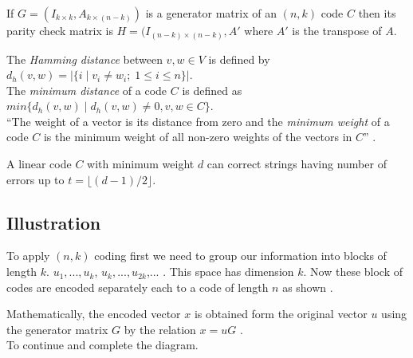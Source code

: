 \begin{theorem} \cite{coding}
  If \(G=(I_{k \times k},A_{k \times (n-k)})\) is a generator matrix of an \((n,k)\) code \(C\) then its parity check matrix is \(H=(I_{(n-k) \times (n-k)}, A'\) where \(A'\) is the transpose of \(A\).
\end{theorem}

\begin{definition} \cite{coding}
  The \textit{Hamming distance} between \(v,w \in V\) is defined by \(d_h(v,w)=|\{i\;|\; v_i \neq w_i;\; 1 \leq i \leq n \}|\).\\
  The \textit{minimum distance} of a code \(C\) is defined as \(min\{d_h(v,w)\;|\; d_h(v,w) \neq 0, v,w \in C\}\).\\
  ``The weight of a vector is its distance from zero and the \textit{minimum weight} of a code \(C\) is the minimum weight of all non-zero weights of the vectors in \(C\)'' \cite{error_correct}.
\end{definition}

\begin{theorem} \cite{error_correct}
  A linear code \(C\) with minimum weight \(d\) can correct strings having number of errors up to \(t= \lfloor (d-1)/2 \rfloor\).
\end{theorem}

\subsection{Illustration}
To apply \((n,k)\) coding first we need to group our information into blocks of length \(k\).
\(u_1,...,u_k\),  \(u_k,...,u_{2k}\),... . This space has dimension \(k\). Now these block of codes are encoded separately each to a code of length \(n\) as shown \cite{coding}.

\vspace{5mm}

\vspace{4mm}
\noindent
Mathematically, the encoded vector \(x\) is obtained form the original vector \(u\) using the generator matrix \(G\) by the relation \(x=uG\) \cite{coding}.\\[5mm] To continue and complete the diagram.\\

